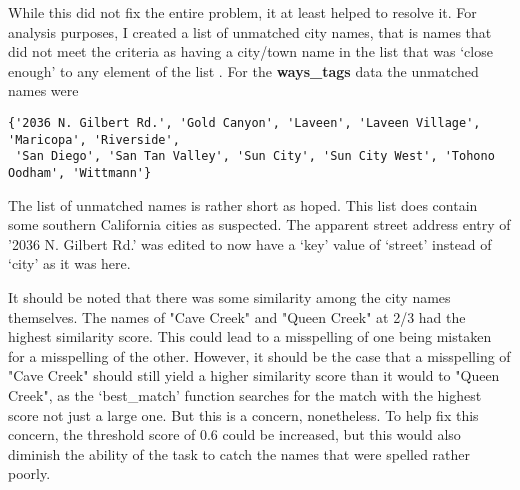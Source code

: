 \documentclass{article}
\begin{document}
%          
%    
%
%

While this did not fix the entire problem, it at least helped to resolve it.  For analysis purposes, I created a list of unmatched city names, that is names that did not meet the criteria as having a city/town name in the list that was `close enough' to any element of the list .  For the \textbf{ways\_tags} data the unmatched names were
\begin{verbatim}
{'2036 N. Gilbert Rd.', 'Gold Canyon', 'Laveen', 'Laveen Village', 'Maricopa', 'Riverside',
 'San Diego', 'San Tan Valley', 'Sun City', 'Sun City West', 'Tohono Oodham', 'Wittmann'}
\end{verbatim}

The list of unmatched names is rather short as hoped.  This list does contain some southern California cities as suspected.  The apparent street address entry of '2036 N. Gilbert Rd.' was edited to now have a `key' value of `street' instead of `city' as it was here.  

It should be noted that there was some similarity among the city names themselves.  The names of "Cave Creek" and "Queen Creek" at 2/3 had the highest similarity score. This could lead to a misspelling of one being mistaken for a misspelling of the other.  However, it should be the case that a misspelling of "Cave Creek" should still yield a higher similarity score than it would to "Queen Creek", as the `best\_match' function searches for the match with the highest score not just a large one.  But this is a concern, nonetheless.  To help fix this concern, the threshold score of 0.6 could be increased, but this would also diminish the ability of the task to catch the names that were spelled rather poorly.
\end{document}
